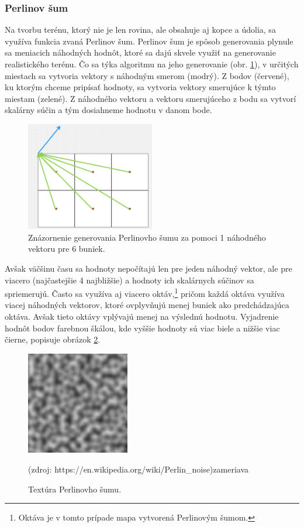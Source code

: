 \documentclass[12pt]{article}
\begin{document}
\subsubsection{Perlinov šum}

Na tvorbu terénu, ktorý nie je len rovina, ale obsahuje aj kopce a údolia,
sa využíva funkcia zvaná Perlinov šum.
Perlinov šum je spôsob generovania plynule sa meniacich náhodných
hodnôt, ktoré sa dajú skvele využiť na generovanie realistického terénu.
Čo sa týka algoritmu na jeho generovanie (obr. \ref{obr:perlinov sum}),
v určitých miestach sa vytvoria
vektory s náhodným smerom (modrý). Z bodov (červené), ku ktorým chceme pripísať
hodnoty, sa vytvoria vektory smerujúce k týmto miestam (zelené). Z náhodného
vektoru a vektoru smerujúceho z bodu sa vytvorí skalárny súčin a tým dosiahneme
hodnotu v danom bode.

\begin{figure}[ht]
	\centering
	\captionsetup{justification=centering}
	\includegraphics[width=0.5\textwidth]{res/prelinov_sum.png}
	\caption{Znázornenie generovania Perlinovho šumu za pomoci 1 náhodného
		vektoru pre 6 buniek.}
	\label{obr:perlinov sum}
\end{figure}

Avšak väčšinu času sa hodnoty nepočítajú len pre jeden náhodný vektor,
ale pre viacero (najčastejšie 4 najbližšie) a hodnoty ich skalárnych súčinov
sa spriemerujú. Často sa využíva aj viacero oktáv,\footnote{
	Oktáva je v tomto prípade mapa vytvorená Perlinovým šumom.
} pričom každá oktáva využíva
viacej náhodných vektorov, ktoré ovplyvňujú menej buniek ako predchádzajúca
oktáva. Avšak tieto oktávy vplývajú menej na výslednú hodnotu. Vyjadrenie hodnôt bodov
farebnou škálou, kde vyššie hodnoty sú viac biele a nižšie viac čierne, popisuje
obrázok \ref{obr:perlinov sum textura}.

\begin{figure}[ht]
	\centering
	\includegraphics[width=0.4\textwidth]{res/perlinov_sum_textura.png}
	\caption{Textúra Perlinovho šumu.}
	\footnotesize (zdroj: https://en.wikipedia.org/wiki/Perlin\_noise)zameriava 
	\label{obr:perlinov sum textura}
\end{figure}
\end{document}
